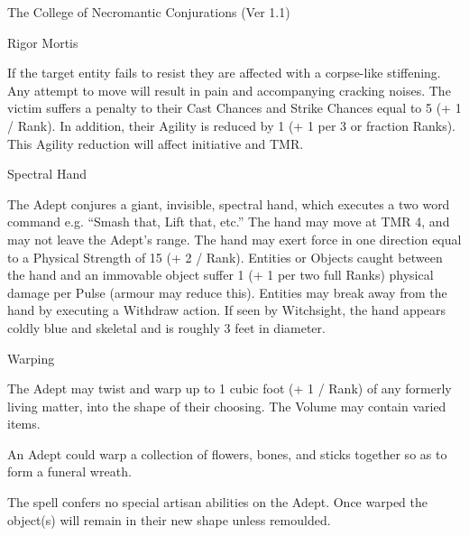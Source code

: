 \begin{Chapter}{The College of Necromantic Conjurations (Ver 1.1)}
\begin{spell}[G-9]{Rigor Mortis}
\begin{effects}
If the target entity fails to resist they are affected with a
corpse-like stiffening. Any attempt to move will result in pain and
accompanying cracking noises.  The victim suffers a penalty to their
Cast Chances and Strike Chances equal to 5 (+ 1 / Rank).  In addition,
their Agility is reduced by 1 (+ 1 per 3 or fraction Ranks).  This
Agility reduction will affect initiative and TMR.
\end{effects}
\end{spell}

\begin{spell}[G-10]{Spectral Hand}
\begin{effects}
The Adept conjures a giant, invisible, spectral hand, which executes a
two word command e.g.  “Smash that, Lift that, etc.”  The hand may
move at TMR 4, and may not leave the Adept’s range.  The hand may
exert force in one direction equal to a Physical Strength of 15 (+ 2 /
Rank). Entities or Objects caught between the hand and an immovable
object suffer 1 (+ 1 per two full Ranks) physical damage per Pulse
(armour may reduce this).  Entities may break away from the hand by
executing a Withdraw action.  If seen by Witchsight, the hand appears
coldly blue and skeletal and is roughly 3 feet in diameter.
\end{effects}
\end{spell}

\begin{spell}[G-11]{Warping}
\begin{effects}
The Adept may twist and warp up to 1 cubic foot (+ 1 / Rank) of any
formerly living matter, into the shape of their choosing.  The Volume
may contain varied items.

\begin{example} 
An Adept could warp a collection of flowers, bones, and sticks
together so as to form a funeral wreath.
\end{example}

The spell confers no special artisan abilities on the Adept.  Once
warped the object(s) will remain in their new shape unless remoulded.
\end{effects}
\end{spell}


\end{Chapter}

